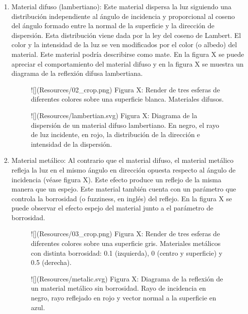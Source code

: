 \documentclass[10pt, a4paper]{article}
\begin{document}
\begin{enumerate}
    
\item Material difuso (lambertiano): Este material dispersa la luz siguiendo una distribución independiente al ángulo de incidencia y proporcional al coseno del ángulo formado entre la normal de la superficie y la dirección de dispersión. Esta distribución viene dada por la ley del coseno de Lambert. El color y la intensidad de la luz se ven modificados por el color (o albedo) del material. Este material podría describirse como mate. En la figura X se puede apreciar el comportamiento del material difuso y en la figura X se muestra un diagrama de la reflexión difusa lambertiana.

\begin{figure}[h] 
![](Resources/02_crop.png)
Figura X: Render de tres esferas de diferentes colores sobre una superficie blanca. Materiales difusos.
\end{figure}

\begin{figure}[h] 
![](Resources/lambertian.svg)
Figura X: Diagrama de la dispersión de un material difuso lambertiano. En negro, el rayo de luz incidente, en rojo, la distribución de la dirección e intensidad de la dispersión.
\end{figure}

\item Material metálico: Al contrario que el material difuso, el material metálico refleja la luz en el mismo ángulo en dirección opuesta respecto al ángulo de incidencia (véase figura X). Este efecto produce un reflejo de la misma manera que un espejo. Este material también cuenta con un parámetro que controla la borrosidad (o fuzziness, en inglés) del reflejo. En la figura X se puede observar el efecto espejo del material junto a el parámetro de borrosidad.

\begin{figure}[h] 
![](Resources/03_crop.png)
Figura X: Render de tres esferas de diferentes colores sobre una superficie gris. Materiales metálicos con distinta borrosidad: 0.1 (izquierda), 0 (centro y superficie) y 0.5 (derecha).
\end{figure}

\begin{figure}[h] 
![](Resources/metalic.svg)
Figura X: Diagrama de la reflexión de un material metálico sin borrosidad. Rayo de incidencia en negro, rayo reflejado en rojo y vector normal a la superficie en azul.
\end{figure}


\end{enumerate}
\end{document}
